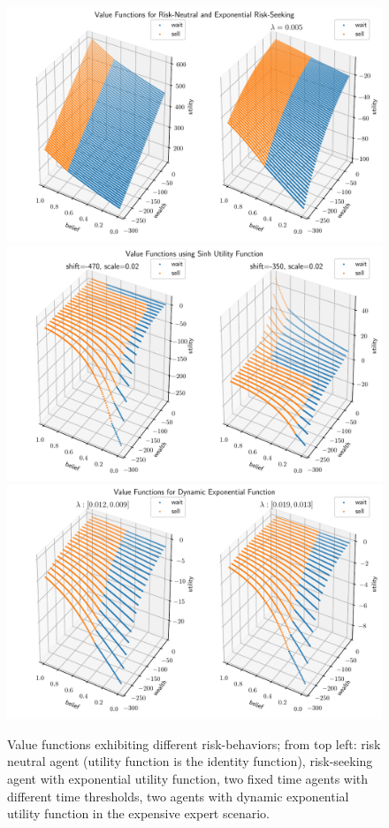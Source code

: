 
\begin{figure}
    \includegraphics[width=0.9\linewidth]{img/exp_policy.pdf}\\
    \includegraphics[width=0.9\linewidth]{img/sinh_policy.pdf}\\
    \includegraphics[width=0.9\linewidth]{img/dyn_policy.pdf}
    \caption{Value functions exhibiting different risk-behaviors; from top left: risk neutral agent (utility function is the identity function), risk-seeking agent with exponential utility function, two fixed time agents with different time thresholds, two agents with dynamic exponential utility function in the expensive expert scenario.}
\end{figure}

